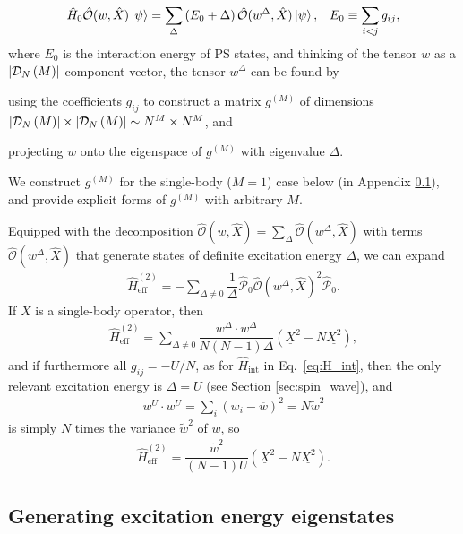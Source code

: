 \documentclass[aps,pra,nofootinbib,twocolumn,superscriptaddress]{revtex4-2}
\renewcommand{\t}{\text} %
\newcommand{\f}[2]{\dfrac{#1}{#2}} %
\newcommand{\p}[1]{\left(#1\right)} %
\newcommand{\1}{\mathds{1}}
\renewcommand{\H}{\hat H}
\renewcommand{\O}{\hat{\mathcal{O}}}
\renewcommand{\P}{\hat{\mathcal{P}}}
\newcommand{\D}{\mathcal{D}}
\newcommand{\col}{\underline}
\newcommand{\mean}{\overline}
\begin{document}
\begin{align}
  \H_0 \O(w,\hat X) \ket\psi
  = \sum_\Delta \p{E_0+\Delta} \O(w^\Delta,\hat X) \ket\psi,
  &&
  E_0 \equiv \sum_{i<j} g_{ij},
  \label{eq:excitation}
\end{align}
where $E_0$ is the interaction energy of PS states, and thinking of the tensor $w$ as a $\abs{\D_N\p{M}}$-component vector, the tensor $w^\Delta$ can be found by
\begin{enumerate*}
\item using the coefficients $g_{ij}$ to construct a matrix $g^{(M)}$ of dimensions $\abs{\D_N\p{M}}\times\abs{\D_N\p{M}}\sim N^M\times N^M$, and
\item projecting $w$ onto the eigenspace of $g^{(M)}$ with eigenvalue $\Delta$.
\end{enumerate*}
We construct $g^{(M)}$ for the single-body ($M=1$) case below (in Appendix \ref{sec:eigenstates}), and provide explicit forms of $g^{(M)}$ with arbitrary $M$.

Equipped with the decomposition $\O(w,\hat X)=\sum_\Delta\O(w^\Delta,\hat X)$ with terms $\O(w^\Delta,\hat X)$ that generate states of definite excitation energy $\Delta$, we can expand
\begin{align}
  \H_{\t{eff}}^{(2)} = -\sum_{\Delta\ne0} \f1\Delta
  \P_0 \O(w^\Delta,\hat X)^2 \P_0.
\end{align}
If $X$ is a single-body operator, then
\begin{align}
  \H_{\t{eff}}^{(2)}
  = \sum_{\Delta\ne0} \f{w^\Delta\cdot w^\Delta}{N\p{N-1}\Delta}
  \p{\col{X}^2 - N \col{X^2}},
\end{align}
and if furthermore all $g_{ij}=-U/N$, as for $\H_{\t{int}}$ in Eq.~\eqref{eq:H_int}, then the only relevant excitation energy is $\Delta=U$ (see Section \ref{sec:spin_wave}), and
\begin{align}
  w^U\cdot w^U = \sum_i \p{w_i-\mean w}^2 = N \widetilde{w}^2
\end{align}
is simply $N$ times the variance $\widetilde{w}^2$ of $w$, so
\begin{align}
  \H_{\t{eff}}^{(2)}
  = \f{\widetilde{w}^2}{\p{N-1}U} \p{\col{X}^2 - N \col{X^2}}.
\end{align}

\subsection{Generating excitation energy eigenstates}
\label{sec:eigenstates}
\end{document}
